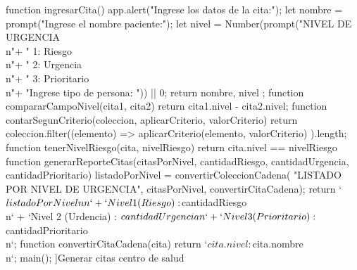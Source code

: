 \documentclass{article}
\begin{document}
{\begin{Form}
{{      }
      function ingresarCita() {
         app.alert("Ingrese los datos de la cita:");
         let nombre = prompt("Ingrese el nombre paciente:");
         let nivel = Number(prompt("NIVEL DE URGENCIA\\n"+
               "  1: Riesgo\\n"+
               "  2: Urgencia\\n"+
               "  3: Prioritario\\n"+
               "Ingrese tipo de persona: ")) || 0;
         return { nombre, nivel };
      }
      function compararCampoNivel(cita1, cita2) {
         return cita1.nivel - cita2.nivel;
      }
      function contarSegunCriterio(coleccion, aplicarCriterio, valorCriterio) {
         return coleccion.filter((elemento) => aplicarCriterio(elemento, valorCriterio) ).length;
      }
      function tenerNivelRiesgo(cita, nivelRiesgo) {
         return cita.nivel == nivelRiesgo
      }
      function generarReporteCitas(citasPorNivel,
                                 cantidadRiesgo,
                                 cantidadUrgencia,
                                 cantidadPrioritario) {
         listadoPorNivel = convertirColeccionCadena(
            "LISTADO POR NIVEL DE URGENCIA", 
            citasPorNivel, 
            convertirCitaCadena);
         return `${listadoPorNivel}\\n\\n` +
            `Nivel 1 (Riesgo)     : ${cantidadRiesgo}\\n` +
            `Nivel 2 (Urdencia)   : ${cantidadUrgencia}\\n` + 
            `Nivel 3 (Prioritario): ${cantidadPrioritario}\\n`;
      }
      function convertirCitaCadena(cita) {
         return `${cita.nivel} : ${cita.nombre}\\n`;
      }
      main();
    }]{Generar citas centro de salud}
  \end{Form}

  \vspace{0.2cm} 

  \begin{Form}
     \TextField[name=salida,width=10cm,height=15cm,multiline=true,readonly=true]{}
  \end{Form} 

}
\end{document}
